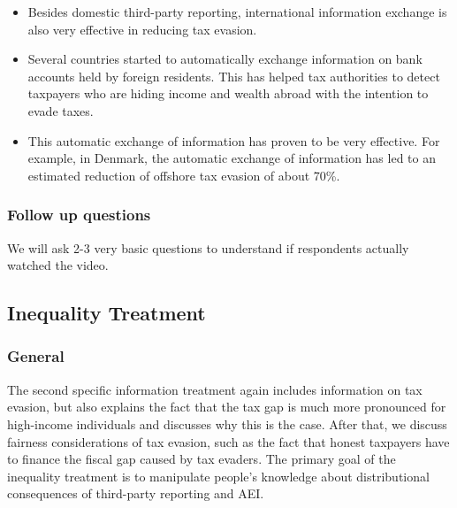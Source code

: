 \documentclass[11pt]{article}
\begin{document}
\begin{itemize}
\begin{itemize}
\end{itemize}
\item Besides domestic third-party reporting, international information exchange is also very effective in reducing tax evasion. 
\item Several countries started to automatically exchange information on bank accounts held by foreign residents. This has helped tax authorities to detect taxpayers who are hiding income and wealth abroad with the intention to evade taxes.
\item This automatic exchange of information has proven to be very effective. For example, in Denmark, the automatic exchange of information has led to an estimated reduction of offshore tax evasion of about 70\%. 

\end{itemize}
\subsubsection*{Follow up questions}
We will ask 2-3 very basic questions to understand if respondents actually watched the video.
\subsection{Inequality Treatment}
\subsubsection*{General}
The second specific information treatment again includes information on tax evasion, but also explains the fact that the tax gap is much more pronounced for high-income individuals and discusses why this is the case. After that, we discuss fairness considerations of tax evasion, such as the fact that honest taxpayers have to finance the fiscal gap caused by tax evaders. The primary goal of the inequality treatment is to manipulate people’s knowledge about distributional consequences of third-party reporting and AEI.  
\end{document}
